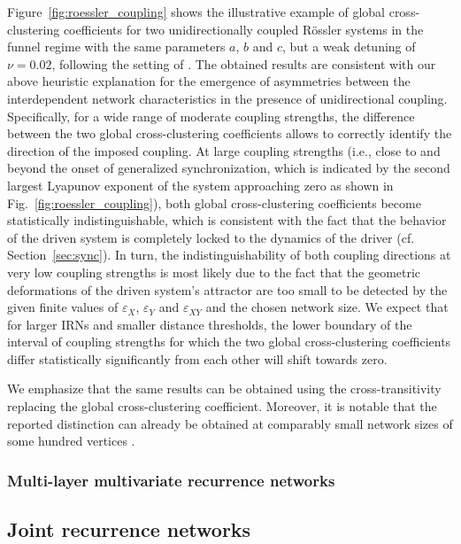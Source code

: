 Figure~\ref{fig:roessler_coupling} shows the illustrative example of global cross-clustering coefficients for two unidirectionally coupled R\"ossler systems in the funnel regime with the same parameters $a$, $b$ and $c$, but a weak detuning of $\nu=0.02$, following the setting of \cite{Feldhoff2012}. The obtained results are consistent with our above heuristic explanation for the emergence of asymmetries between the interdependent network characteristics in the presence of unidirectional coupling. Specifically, for a wide range of moderate coupling strengths, the difference between the two global cross-clustering coefficients allows to correctly identify the direction of the imposed coupling. At large coupling strengths (i.e., close to and beyond the onset of generalized synchronization, which is indicated by the second largest Lyapunov exponent of the system approaching zero as shown in Fig.~\ref{fig:roessler_coupling}), both global cross-clustering coefficients become statistically indistinguishable, which is consistent with the fact that the behavior of the driven system is completely locked to the dynamics of the driver (cf. Section~\ref{sec:sync}). In turn, the indistinguishability of both coupling directions at very low coupling strengths is most likely due to the fact that the geometric deformations of the driven system's attractor are too small to be detected by the given finite values of $\varepsilon_X$, $\varepsilon_Y$ and $\varepsilon_{XY}$ and the chosen network size. We expect that for larger IRNs and smaller distance thresholds, the lower boundary of the interval of coupling strengths for which the two global cross-clustering coefficients differ statistically significantly from each other will shift towards zero.

We emphasize that the same results can be obtained using the cross-transitivity replacing the global cross-clustering coefficient. Moreover, it is notable that the reported distinction can already be obtained at comparably small network sizes of some hundred vertices \cite{Feldhoff2012}.




\subsubsection{Multi-layer multivariate recurrence networks}

	\subsection{Joint recurrence networks}
      
